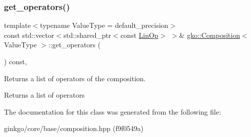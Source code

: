 \subsubsection{\texorpdfstring{get\+\_\+operators()}{get\_operators()}}
{\footnotesize\ttfamily template$<$typename Value\+Type  = default\+\_\+precision$>$ \\
const std\+::vector$<$std\+::shared\+\_\+ptr$<$const \hyperlink{classgko_1_1LinOp}{Lin\+Op}$>$ $>$\& \hyperlink{classgko_1_1Composition}{gko\+::\+Composition}$<$ Value\+Type $>$\+::get\+\_\+operators (\begin{DoxyParamCaption}{ }\end{DoxyParamCaption}) const\hspace{0.3cm}{\ttfamily [inline]}, {\ttfamily [noexcept]}}



Returns a list of operators of the composition. 

\begin{DoxyReturn}{Returns}
a list of operators 
\end{DoxyReturn}


The documentation for this class was generated from the following file\+:\begin{DoxyCompactItemize}
\item 
ginkgo/core/base/composition.\+hpp (f9f0549a)\end{DoxyCompactItemize}
